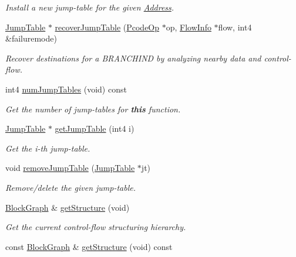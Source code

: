 \begin{DoxyCompactItemize}
\begin{DoxyCompactList}\small\item\em Install a new jump-\/table for the given \mbox{\hyperlink{class_address}{Address}}. \end{DoxyCompactList}\item 
\mbox{\hyperlink{class_jump_table}{Jump\+Table}} $\ast$ \mbox{\hyperlink{class_funcdata_a38d58c33cdc77c663fceb7de1f6aadeb}{recover\+Jump\+Table}} (\mbox{\hyperlink{class_pcode_op}{Pcode\+Op}} $\ast$op, \mbox{\hyperlink{class_flow_info}{Flow\+Info}} $\ast$flow, int4 \&failuremode)
\begin{DoxyCompactList}\small\item\em Recover destinations for a B\+R\+A\+N\+C\+H\+I\+ND by analyzing nearby data and control-\/flow. \end{DoxyCompactList}\item 
int4 \mbox{\hyperlink{class_funcdata_a30603a803c816264c105023c3456bcd7}{num\+Jump\+Tables}} (void) const
\begin{DoxyCompactList}\small\item\em Get the number of jump-\/tables for {\bfseries{this}} function. \end{DoxyCompactList}\item 
\mbox{\hyperlink{class_jump_table}{Jump\+Table}} $\ast$ \mbox{\hyperlink{class_funcdata_a475047d15d64d653871facd75f7244ed}{get\+Jump\+Table}} (int4 i)
\begin{DoxyCompactList}\small\item\em Get the i-\/th jump-\/table. \end{DoxyCompactList}\item 
void \mbox{\hyperlink{class_funcdata_a2e75df713649c7bba52b17b1b84bbcf6}{remove\+Jump\+Table}} (\mbox{\hyperlink{class_jump_table}{Jump\+Table}} $\ast$jt)
\begin{DoxyCompactList}\small\item\em Remove/delete the given jump-\/table. \end{DoxyCompactList}\item 
\mbox{\hyperlink{class_block_graph}{Block\+Graph}} \& \mbox{\hyperlink{class_funcdata_a8010b1f0044fd3a03f8f717279ffc0b1}{get\+Structure}} (void)
\begin{DoxyCompactList}\small\item\em Get the current control-\/flow structuring hierarchy. \end{DoxyCompactList}\item 
const \mbox{\hyperlink{class_block_graph}{Block\+Graph}} \& \mbox{\hyperlink{class_funcdata_a036b9724068d4c5b319858e98854f31c}{get\+Structure}} (void) const

\end{DoxyCompactItemize}
